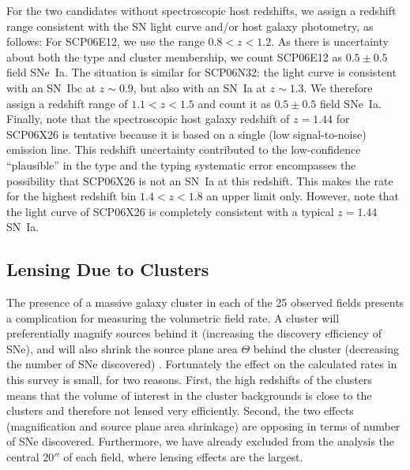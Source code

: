 
For the two candidates without spectroscopic host redshifts, we assign
a redshift range consistent with the SN light curve and/or host galaxy
photometry, as follows: For SCP06E12, we use the range $0.8<z<1.2$. As
there is uncertainty about both the type and cluster membership, we
count SCP06E12 as $0.5 \pm 0.5$ field SNe~Ia. The situation is similar
for SCP06N32: the light curve is consistent with an SN~Ibc at $z \sim
0.9$, but also with an SN~Ia at $z \sim 1.3$. We therefore assign a
redshift range of $1.1 < z < 1.5$ and count it as $0.5 \pm 0.5$ field
SNe~Ia. Finally, note that the spectroscopic host galaxy redshift of
$z=1.44$ for SCP06X26 is tentative because it is based on a single
(low signal-to-noise) emission line. This redshift uncertainty
contributed to the low-confidence ``plausible'' in the type and the
typing systematic error encompasses the possibility that SCP06X26 is
not an SN~Ia at this redshift. This makes the rate for the highest
redshift bin $1.4 < z <1.8$ an upper limit only. However, note that
the light curve of SCP06X26 is completely consistent with a typical
$z=1.44$ SN~Ia.


\subsection{Lensing Due to Clusters} \label{sec:lensing}

The presence of a massive galaxy cluster in each of the 25 observed
fields presents a complication for measuring the volumetric field
rate. A cluster will preferentially magnify sources behind it
(increasing the discovery efficiency of SNe), and will also shrink the
source plane area $\Theta$ behind the cluster (decreasing the number
of SNe discovered) \citep[e.g.,][]{goobar09a}. Fortunately the effect
on the calculated rates in this survey is small, for two
reasons. First, the high redshifts of the clusters means that the
volume of interest in the cluster backgrounds is close to the clusters
and therefore not lensed very efficiently. Second, the two effects
(magnification and source plane area shrinkage) are opposing in terms
of number of SNe discovered.  Furthermore, we have already excluded
from the analysis the central $20''$ of each field, where lensing
effects are the largest.

